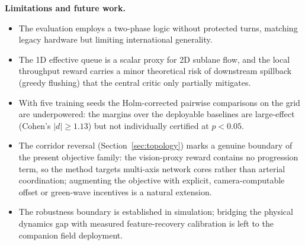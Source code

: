 \noindent\textbf{Limitations and future work.}
\begin{itemize}
  \item The evaluation employs a two-phase logic without protected turns, matching legacy
        hardware but limiting international generality.
  \item The 1D effective queue is a scalar proxy for 2D sublane flow, and the local
        throughput reward carries a minor theoretical risk of downstream spillback (greedy
        flushing) that the central critic only partially mitigates.
  \item With five training seeds the Holm-corrected pairwise comparisons on the grid are
        underpowered: the margins over the deployable baselines are large-effect (Cohen's
        $|d| \geq 1.13$) but not individually certified at $p < 0.05$.
  \item The corridor reversal (Section~\ref{sec:topology}) marks a genuine boundary of the
        present objective family: the vision-proxy reward contains no progression term, so
        the method targets multi-axis network cores rather than arterial coordination;
        augmenting the objective with explicit, camera-computable offset or green-wave
        incentives is a natural extension.
  \item The robustness boundary is established in simulation; bridging the physical
        dynamics gap with measured feature-recovery calibration is left to the companion
        field deployment.
\end{itemize}
